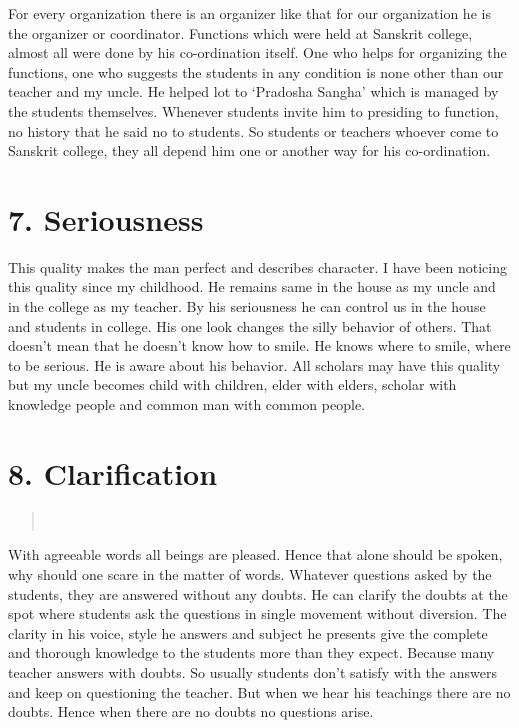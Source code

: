 For every organization there is an organizer like that for our organization he is the organizer or coordinator. Functions which were held at Sanskrit college, almost all were done by his co-ordination itself. One who helps for organizing the functions, one who suggests the students in any condition is none other than our teacher and my uncle.
He helped lot to ‘Pradosha Sangha’ which is managed by the students themselves. Whenever students invite him to presiding to function, no history that he said no to students. So students or teachers whoever come to Sanskrit college, they all depend him one or another way for his co-ordination.

\section*{7. Seriousness }

This quality makes the man perfect and describes character. I have been noticing this quality since my childhood. He remains same in the house as my uncle and in the college as my teacher. By his seriousness he can control us in the house and students in college. His one look changes the silly behavior of others. That doesn’t mean that he doesn’t know how to smile. He knows where to smile, where to be serious. He is aware about his behavior. All scholars may have this quality but my uncle becomes child with children, elder with elders, scholar with knowledge people and common man with common people.

\section*{8. Clarification }
\begin{verse}
\\
\end{verse}
With agreeable words all beings are pleased. Hence that alone should be spoken, why should one scare in the matter of words.
Whatever questions asked by the students, they are answered without any doubts. He can clarify the doubts at the spot where students ask the questions in single movement without diversion. The clarity in his voice, style he answers and subject he presents give the complete and thorough knowledge to the students more than they expect. Because many teacher answers with doubts. So usually students don’t satisfy with the answers and keep on questioning the teacher. But when we hear his teachings there are no doubts. Hence when there are no doubts no questions arise.

